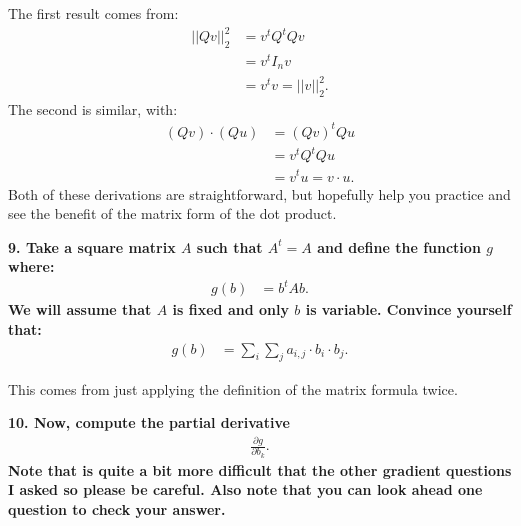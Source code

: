 \documentclass[12pt,hidelinks]{article}
\numberwithin{equation}{section}
\begin{document}
\vspace*{12pt}

The first result comes from:
\begin{align}
||Q v ||_2^2 &= v^t Q^t Q v \\
&= v^t I_n v \\
&= v^t v = ||v||_2^2.
\end{align}
The second is similar, with:
\begin{align}
(Qv) \cdot (Qu) &= (Qv)^t Qu \\
&= v^t Q^t Q u \\
&= v^t u = v \cdot u.
\end{align}
Both of these derivations are straightforward, but hopefully help you practice
and see the benefit of the matrix form of the dot product.

\vspace*{12pt}

\textbf{9. Take a square matrix $A$ such that $A^t = A$ and define the function $g$
where:}
\begin{align}
g(b) &= b^t A b.
\end{align}
\textbf{We will assume that $A$ is fixed and only $b$ is variable. Convince yourself
that:}
\begin{align}
g(b) &= \sum_i \sum_j a_{i,j} \cdot b_i \cdot b_j.
\end{align}

\vspace*{12pt}

This comes from just applying the definition of the matrix formula twice.

\vspace*{12pt}

\textbf{10. Now, compute the partial derivative}
\begin{align}
\frac{\partial g}{\partial b_k}.
\end{align}
\textbf{Note that is quite a bit more difficult that the other gradient questions I asked
so please be careful. Also note that you can look ahead one question to check
your answer.}

\vspace*{12pt}
\end{document}
